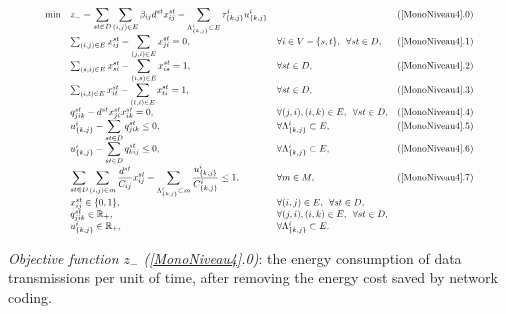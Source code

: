 \begin{equation}
\resizebox{0.91\hsize}{!}{$
\begin{array}{llll}
\min &z_{-} =  \displaystyle \sum_{st \in D} \displaystyle \sum_{(i,j) \in E} \beta_{ij} d^{st} x^{st}_{ij}   -  \displaystyle   \sum_{\Lambda^i_{\{k,j\}} \subset E}   \tau^i_{\{k,j\}}u^i_{\{k,j\}}     &&  (\ref{MonoNiveau4}.0)\\
\displaystyle  & \sum_{(i,j) \in E} x^{st}_{ij}-\displaystyle \sum_{(j,i) \in E} x^{st}_{ji} = 0, & \forall i \in V - \{s,t\},\enspace \forall st \in D, & (\ref{MonoNiveau4}.1)\\
\displaystyle &  \sum_{(s, i) \in E} x^{st}_{si} - \displaystyle \sum_{(i, s) \in E} x^{st}_{is}   = 1, & \forall st \in D, & (\ref{MonoNiveau4}.2)\\
\displaystyle  & \sum_{(i, t) \in E} x^{st}_{it}  - \displaystyle \sum_{(t, i) \in E} x^{st}_{ti}   = 1, & \forall st \in D, & (\ref{MonoNiveau4}.3)\\
& q^{st}_{jik} - d^{st}x^{st}_{ji}x^{st}_{ik} = 0, & \forall (j,i),(i,k) \in E, \enspace \forall st \in D, & (\ref{MonoNiveau4}.4)\\
& u^i_{\{k,j\}} - \displaystyle \sum_{st \in D} q^{st}_{jik} \le 0, &\forall
 \Lambda^i_{\{k,j\}}  \subset E,&(\ref{MonoNiveau4}.5)\\
& u^i_{\{k,j\}} - \displaystyle \sum_{st \in D} q^{st}_{kij} \le 0, &\forall
 \Lambda^i_{\{k,j\}}  \subset E,&(\ref{MonoNiveau4}.6)\\
& \displaystyle \sum_{st \in D} \displaystyle \sum_{(i,j) \in m} \frac{d^{st}}{C_{ij}}x^{st}_{ij}  - \displaystyle \sum_{ \Lambda^i_{\{k,j\}}  \subset m}    \frac{u^i_{\{k,j\}}}{C^i_{\{k,j\}}}   \leq 1,  & \forall m \in M,  & (\ref{MonoNiveau4}.7)\\
& x^{st}_{ij} \in \{0,1\}, &\forall (i,j) \in E, \enspace \forall st \in D,&\\
&  q^{st}_{jik} \in \mathbb{R}_{+}, &\forall (j,i),(i,k) \in E,  \enspace \forall st \in D,&\\
& u^i_{\{k,j\}}  \in \mathbb{R}_{+}, &\forall \Lambda^i_{\{k,j\}} \subset E .&\\
\end{array}
$}
\label{MonoNiveau4}
\end{equation}



\textit{Objective function \(z_{-}\)  (\ref{MonoNiveau4}.0)}: the energy consumption of data transmissions per unit of time, after removing the energy cost saved by network coding.

